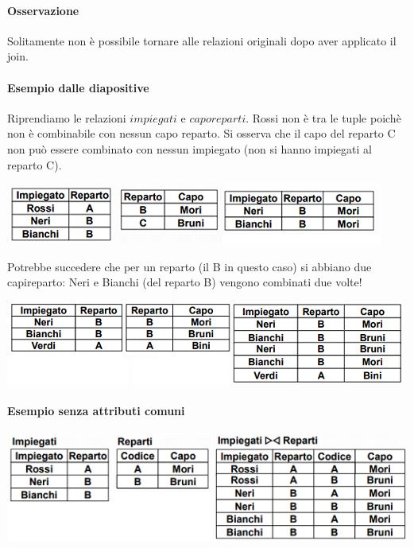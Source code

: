 \paragraph{Osservazione} Solitamente non è possibile tornare alle relazioni originali dopo aver applicato il join.
\paragraph{Esempio dalle diapositive} Riprendiamo le relazioni $impiegati$ e $caporeparti$. Rossi non è tra le tuple poichè non è combinabile con nessun capo reparto. Si osserva che il capo del reparto C non può essere combinato con nessun impiegato (non si hanno impiegati al reparto C). 
\begin{center}
	\includegraphics{images/36.PNG}
\end{center}
Potrebbe succedere che per un reparto (il B in questo caso) si abbiano due capireparto: Neri e Bianchi (del reparto B) vengono combinati due volte!
\begin{center}
	\includegraphics{images/37.PNG}
\end{center}
\paragraph{Esempio senza attributi comuni}
\begin{center}
	\includegraphics{images/39.PNG}
\end{center}
